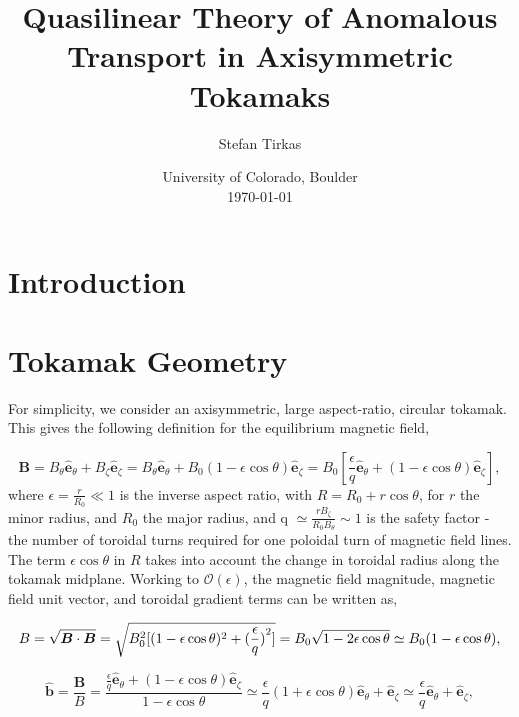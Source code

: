 \documentclass[12pt]{article}
\begin{document}
\title{Quasilinear Theory of Anomalous Transport in Axisymmetric Tokamaks}
\author{Stefan Tirkas}


\date{University of Colorado, Boulder\\[2ex]%
      \today}

\maketitle


\section{Introduction}


\section{Tokamak Geometry}
   \quad For simplicity, we consider an axisymmetric, large aspect-ratio, circular tokamak. This gives
the following definition for the equilibrium magnetic field,

   \begin{equation}
      \bm{B} = B_\theta\bm{\hat{e}}_\theta + B_\zeta\bm{\hat{e}}_\zeta =
               B_\theta\bm{\hat{e}}_\theta + B_0(1-\epsilon\cos\theta)\bm{\hat{e}}_\zeta =
               B_0[\frac{\epsilon}{q}\bm{\hat{e}}_\theta + (1-\epsilon\cos\theta)\bm{\hat{e}}_\zeta],
   \end{equation}
where $\epsilon=\frac{r}{R_0} \ll 1$ is the inverse aspect ratio, with $R=R_0+r\cos\theta$, for $r$ the minor radius,
and $R_0$ the major radius, and q $\simeq\frac{rB_\zeta}{R_0B_\theta}\sim1$ is the safety factor\cite{Wesson} - the number of
toroidal turns required for one poloidal turn of magnetic field lines. The term $\epsilon\cos\theta$ in $R$ takes into
account the change in toroidal radius along the tokamak midplane. Working to $\mathcal{O}(\epsilon)$, the magnetic field
magnitude, magnetic field unit vector, and toroidal gradient terms can be written as,
   
   \begin{equation}
      B = \sqrt{\bm{B}\cdot\bm{B}} = \sqrt{B_0^2[(1-\epsilon\cos\theta)^2 + (\frac{\epsilon}{q})\strut^2]} =
          B_0\sqrt{1-2\epsilon\cos\theta} \simeq B_0(1-\epsilon\cos\theta),
   \end{equation}

   \begin{equation}
      \bm{\hat{b}} = \frac{\bm{B}}{B} = \frac{\frac{\epsilon}{q}\bm{\hat{e}}_\theta + (1-\epsilon\cos\theta)\bm{\hat{e}}_\zeta}
                     {1-\epsilon\cos\theta} \simeq \frac{\epsilon}{q}(1+\epsilon\cos\theta)\bm{\hat{e}}_\theta + 
                     \bm{\hat{e}}_\zeta \simeq \frac{\epsilon}{q}\bm{\hat{e}}_\theta + \bm{\hat{e}}_\zeta,
   \end{equation}
\end{document}
